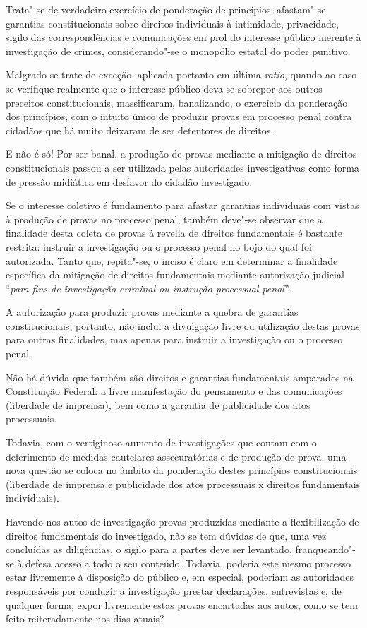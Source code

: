 Trata"-se de verdadeiro exercício de ponderação de princípios: afastam"-se
garantias constitucionais sobre direitos individuais à intimidade,
privacidade, sigilo das correspondências e comunicações em prol do
interesse público inerente à investigação de crimes, considerando"-se o
monopólio estatal do poder punitivo.

Malgrado se trate de exceção, aplicada portanto em última \emph{ratio},
quando ao caso se verifique realmente que o interesse público deva se
sobrepor aos outros preceitos constitucionais, massificaram,
banalizando, o exercício da ponderação dos princípios, com o intuito
único de produzir provas em processo penal contra cidadãos que há muito
deixaram de ser detentores de direitos.

E não é só! Por ser banal, a produção de provas mediante a mitigação de
direitos constitucionais passou a ser utilizada pelas autoridades
investigativas como forma de pressão midiática em desfavor do cidadão
investigado.

Se o interesse coletivo é fundamento para afastar garantias individuais
com vistas à produção de provas no processo penal, também deve"-se
observar que a finalidade desta coleta de provas à revelia de direitos
fundamentais é bastante restrita: instruir a investigação ou o processo
penal no bojo do qual foi autorizada. Tanto que, repita"-se, o inciso 
é claro em determinar a finalidade específica da mitigação de direitos
fundamentais mediante autorização judicial ``\emph{para fins de
investigação criminal ou instrução processual penal}''.

A autorização para produzir provas mediante a quebra de garantias
constitucionais, portanto, não inclui a divulgação livre ou utilização
destas provas para outras finalidades, mas apenas para instruir a
investigação ou o processo penal.

Não há dúvida que também são direitos e garantias fundamentais amparados
na Constituição Federal: a livre manifestação do pensamento e das
comunicações (liberdade de imprensa), bem como a garantia de publicidade
dos atos processuais.

Todavia, com o vertiginoso aumento de investigações que contam com o
deferimento de medidas cautelares assecuratórias e de produção de prova,
uma nova questão se coloca no âmbito da ponderação destes princípios
constitucionais (liberdade de imprensa e publicidade dos atos
processuais x direitos fundamentais individuais).

Havendo nos autos de investigação provas produzidas mediante a
flexibilização de direitos fundamentais do investigado, não se tem
dúvidas de que, uma vez concluídas as diligências, o sigilo para a
partes deve ser levantado, franqueando"-se à defesa acesso a todo o seu
conteúdo. Todavia, poderia este mesmo processo estar livremente à
disposição do público e, em especial, poderiam as autoridades
responsáveis por conduzir a investigação prestar declarações,
entrevistas e, de qualquer forma, expor livremente estas provas
encartadas aos autos, como se tem feito reiteradamente nos dias atuais?


